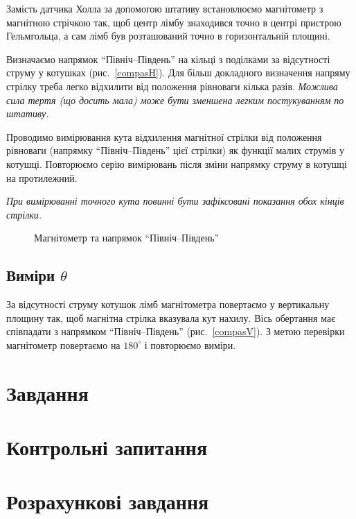 Замість датчика Холла за допомогою штативу встановлюємо магнітометр з магнітною стрічкою так, щоб центр лімбу знаходився точно в центрі пристрою Гельмгольца, а сам лімб був розташований точно в горизонтальній площині.

Визначаємо напрямок ``Північ--Південь'' на кільці з поділками за відсутності струму у котушках (рис.~\ref{compasH}). Для більш докладного визначення напряму стрілку треба легко відхилити від положення рівноваги кілька разів. \textit{Можлива сила тертя (що досить мала) може бути зменшена легким постукуванням по штативу.}

Проводимо вимірювання кута відхилення магнітної стрілки від положення рівноваги (напрямку ``Північ--Південь'' цієї стрілки) як функції малих струмів у котушці.
%
Повторюємо серію вимірювань після зміни напрямку струму в котушці на протилежний.

\textit{При вимірюванні точного кута повинні бути зафіксовані показання обох кінців стрілки.}

\begin{figure}
    \centering


    \caption{Магнітометр та напрямок ``Північ--Південь''}
    \label{compas}
\end{figure}

\subsection{Виміри  $\theta$}

За відсутності струму котушок лімб магнітометра повертаємо у вертикальну площину так, щоб магнітна стрілка вказувала кут нахилу. %
Вісь обертання має співпадати з напрямком ``Північ--Південь'' (рис.~\ref{compasV}). З метою перевірки магнітометр повертаємо на $180^{\circ}$ і повторюємо виміри.


\section{Завдання}


\section{Контрольні запитання}



\section{Розрахункові завдання}



